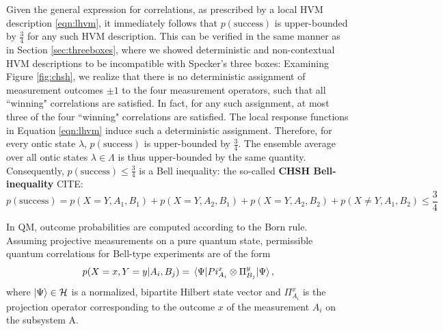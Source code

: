Given the general expression for correlations, as prescribed by a local HVM description \ref{eqn:lhvm}, it immediately follows that $p(\text{{success}})$ is upper-bounded by $\frac{3}{4}$ for any such HVM description. This can be verified in the same manner as in Section \ref{sec:threeboxes}, where we showed deterministic and non-contextual HVM descriptions to be incompatible with Specker's three boxes: Examining Figure \ref{fig:chsh}, we realize that there is no deterministic assignment of measurement outcomes $\pm 1$ to the four measurement operators, such that all ``winning" correlations are satisfied. In fact, for any such assignment, at most three of the four ``winning" correlations are satisfied. The local response functions in Equation \ref{eqn:lhvm} induce such a deterministic assignment. Therefore, for every ontic state $\lambda$, $p(\text{success})$ is upper-bounded by $\frac{3}{4}$. The ensemble average over all ontic states $\lambda\in\Lambda$ is thus upper-bounded by the same quantity.
Consequently, $p(\text{{success}})\leq\frac{3}{4}$ is a Bell inequality: the so-called \textbf{CHSH Bell-inequality} CITE:
\begin{equation}
    \label{eqn:chshineq}
    p(\text{success}) = p(X=Y,A_1,B_1)+p(X=Y,A_2,B_1)+p(X=Y,A_2,B_2)+p(X\neq Y,A_1,B_2)\leq \frac{3}{4}
\end{equation}

In QM, outcome probabilities are computed according to the Born rule. Assuming projective measurements on a pure quantum state, permissible quantum correlations for Bell-type experiments are of the form
\begin{equation}
\label{eqn:born}
p(X=x,Y=y\vert A_i, B_j)=\expval{Pi_{A_i}^x\otimes\Pi_{B_j}^y}{\Psi},
\end{equation}
where $\ket{\Psi}\in\mathcal{H}$ is a normalized, bipartite Hilbert state vector and $\Pi_{A_i}^x$ is the projection operator corresponding to the outcome $x$ of the measurement $A_i$ on the subsystem A.

